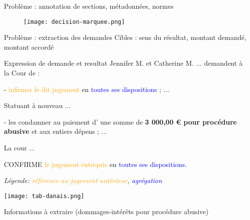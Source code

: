 \begin{frame}[c]{Problème : annotation de sections, métadonnées, normes}
%        
%		
\begin{figure}
	\texttt{[image: decision-marquee.png]}
\end{figure}
\end{frame}

\begin{frame}[c]{Problème : extraction des demandes}
	Cibles : sens du résultat, montant demandé, montant accordé
\begin{exampleblock}{Expression de demande et resultat}
\scriptsize
Jennifer M. et Catherine M. ... demandent à la Cour de :

- \textcolor{orange}{infirmer le dit jugement} en \textcolor{blue}{toutes ses dispositions} ; 
...

Statuant à nouveau ...

- les condamner au paiement d' une somme de  \textbf{3 000,00 € pour procédure abusive} et
aux entiers dépens ; ...

La cour ...  

CONFIRME \textcolor{orange}{le jugement entrepris} en \textcolor{blue}{toutes ses dispositions}.

\end{exampleblock}

\scriptsize{\textit{Légende:  \textcolor{orange}{référence au jugement antérieur},  \textcolor{blue}{agrégation}}}


\begin{table} 
\centering \texttt{[image: tab-danais.png]}
\caption{\scriptsize Informations à extraire (dommages-intérêts pour procédure abusive)}
\end{table}
\end{frame}

